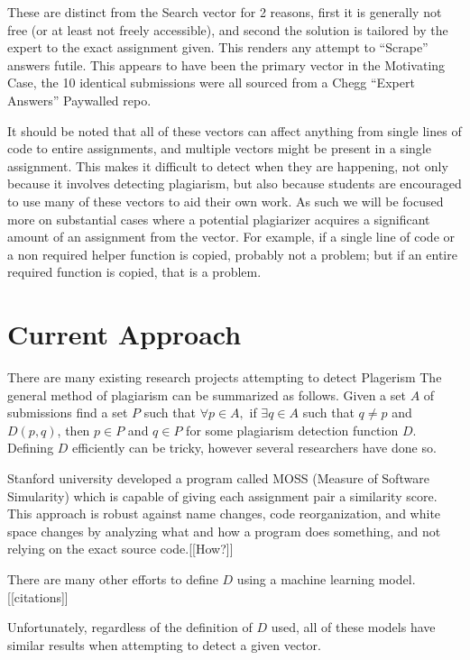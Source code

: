 \documentclass[conference]{IEEEtran}
\newcommand{\n}{\hfill\break}
\begin{document}
\begin{itemize}
\begin{itemize}
	
	\end{itemize} These are distinct from the Search vector for 2 reasons, first it is generally not free (or at least not freely accessible), and second the solution is tailored by the expert to the exact assignment given.  This renders any attempt to ``Scrape'' answers futile.
	This appears to have been the primary vector in the Motivating Case, the 10 identical submissions were all sourced from a Chegg ``Expert Answers'' Paywalled repo.
\end{itemize}
 It should be noted that all of these vectors can affect anything from single lines of code to entire assignments, and multiple vectors might be present in a single assignment.
	This makes it difficult to detect when they are happening, not only because it involves detecting plagiarism, but also because students are encouraged to use many of these vectors to aid their own work.  As such we will be focused more on substantial cases where a potential plagiarizer acquires a significant amount of an assignment from the vector.  For example, if a single line of code or a non required helper function is copied, probably not a problem; but if an entire required function is copied, that is a problem.

\n\section{\textbf{Current Approach}}
	There are many existing research projects attempting to detect Plagerism The general method of plagiarism can be summarized as follows.  Given a set $A$ of submissions find a set $P$ such that  $\forall p\in A,$ if $\exists q\in A$ such that $q\not=p$ and $D(p,q)$, then $p\in P$ and $q\in P$ for some plagiarism detection function $D$.  Defining $D$ efficiently can be tricky, however several researchers have done so.
	
		Stanford university developed a program called MOSS (Measure of Software Simularity) which is capable of giving each assignment pair a similarity score. This approach is robust against name changes, code reorganization, and white space changes by analyzing what and how a program does something, and not relying on the exact source code.[[How?]]
	
	
	There are many other efforts to define $D$ using a machine learning model.[[citations]]
	
	Unfortunately, regardless of the definition of $D$ used, all of these models have similar results when attempting to detect a given vector.
\end{document}
